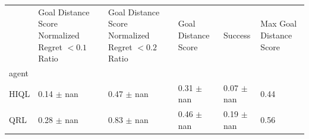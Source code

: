 \begin{tabular}{llllll}
\toprule
 & Goal Distance Score Normalized Regret $< 0.1$ Ratio & Goal Distance Score Normalized Regret $< 0.2$ Ratio & Goal Distance Score & Success & Max Goal Distance Score \\
agent &  &  &  &  &  \\
\midrule
HIQL & 0.14 $\pm$ nan & 0.47 $\pm$ nan & 0.31 $\pm$ nan & 0.07 $\pm$ nan & 0.44 \\
QRL & 0.28 $\pm$ nan & 0.83 $\pm$ nan & 0.46 $\pm$ nan & 0.19 $\pm$ nan & 0.56 \\
\bottomrule
\end{tabular}
